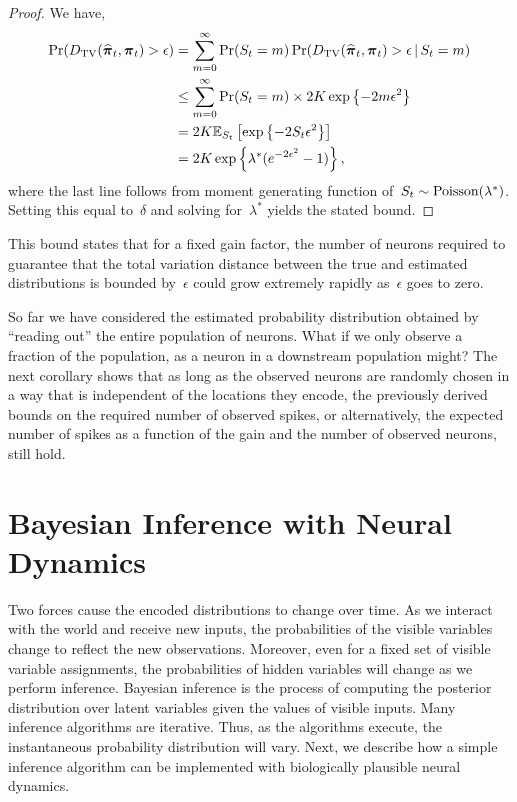\begin{proof}
  We have, 
  \begin{align}
    \Pr({D_{\mathrm{TV}}}(\widehat{\boldsymbol{\pi}}_t, \boldsymbol{\pi}_t) > \epsilon) 
    &= \sum_{m=0}^\infty \Pr(S_t=m) \Pr({D_{\mathrm{TV}}}(\widehat{\boldsymbol{\pi}}_t, \boldsymbol{\pi}_t) > \epsilon \,|\, S_t=m) \\
    &\leq \sum_{m=0}^\infty  \Pr(S_t=m) \times 2K \exp \left \{-2m\epsilon^2 \right\} \\
    &= 2K \mathbb{E}_{S_t} \left[ \exp \left \{ -2S_t \epsilon^2 \right \} \right] \\
    &= 2K \exp \left \{\lambda^* (e^{-2\epsilon^2}-1) \right\},
  \end{align}
  where the last line follows from moment generating function of~${S_t \sim \mathrm{Poisson}(\lambda^*)}$.
  Setting this equal to~$\delta$ and solving for~$\lambda^*$ yields the stated bound.
\end{proof}

This bound states that for a fixed gain factor, the number of neurons
required to guarantee that the total variation distance between the
true and estimated distributions is bounded by~$\epsilon$ could grow
extremely rapidly as~$\epsilon$ goes to zero.

So far we have considered the estimated probability distribution
obtained by ``reading out'' the entire population of neurons. What if
we only observe a fraction of the population, as a neuron in a
downstream population might? The next corollary shows that as long as
the observed neurons are randomly chosen in a way that is independent
of the locations they encode, the previously derived bounds on the required 
number of observed spikes, or alternatively, the expected number of 
spikes as a function of the gain and the number of observed neurons, 
still hold. 

\section{Bayesian Inference with Neural Dynamics}
Two forces cause the encoded distributions to change over time. As
we interact with the world and receive new inputs, the probabilities
of the visible variables change to reflect the new
observations. Moreover, even for a fixed set of visible variable
assignments, the probabilities of hidden variables will change as we
perform inference. Bayesian inference is the process of computing the
posterior distribution over latent variables given the values of visible
inputs. Many inference algorithms are iterative. Thus, as the
algorithms execute, the instantaneous probability distribution will
vary. Next, we describe how a simple inference algorithm can be
implemented with biologically plausible neural dynamics.

